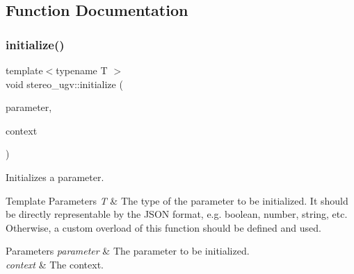 \subsection{Function Documentation}
\mbox{\label{namespacestereo__ugv_a6971cc11001fdf589a71f6fb3099c65b}} 
\subsubsection{\texorpdfstring{initialize()}{initialize()}}
{\footnotesize\ttfamily template$<$typename T $>$ \\
void stereo\+\_\+ugv\+::initialize (\begin{DoxyParamCaption}\item[{T $\ast$}]{parameter,  }\item[{const \hyperlink{classstereo__ugv_1_1Context}{Context} \&}]{context }\end{DoxyParamCaption})\hspace{0.3cm}{\ttfamily [inline]}}



Initializes a parameter. 


\begin{DoxyTemplParams}{Template Parameters}
{\em T} & The type of the parameter to be initialized. It should be directly representable by the J\+S\+ON format, e.\+g. boolean, number, string, etc. Otherwise, a custom overload of this function should be defined and used. \\
\hline
\end{DoxyTemplParams}

\begin{DoxyParams}{Parameters}
{\em parameter} & The parameter to be initialized. \\
\hline
{\em context} & The context. \\
\hline
\end{DoxyParams}
